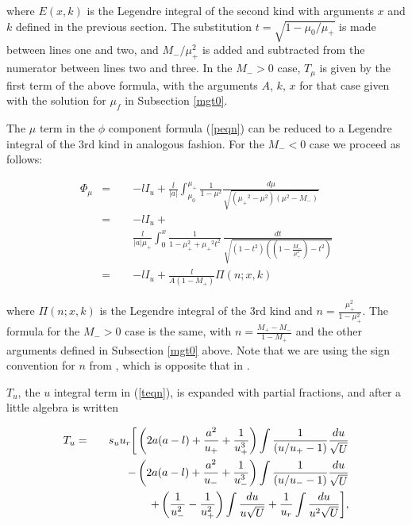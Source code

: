 \documentclass[apj]{emulateapj}
\begin{document}
\noindent where $E(x,k)$ is the Legendre integral of the second kind with arguments $x$ and $k$ defined in the previous section. The substitution $t=\sqrt{1-\mu_0/\mu_+}$ is made between lines one and two, and $M_-/\mu_+^2$ is added and subtracted from the numerator between lines two and three. In the $M_- > 0$ case, $T_\mu$ is given by the first term of the above formula, with the arguments $A$, $k$, $x$ for that case given with the solution for $\mu_f$ in Subsection \ref{mgt0}.

The $\mu$ term in the $\phi$ component formula (\ref{peqn}) can be reduced to a Legendre integral of the 3rd kind in analogous fashion. For the $M_- < 0$ case we proceed as follows:

\begin{eqnarray}
 \Phi_{\mu} &=& -l I_u + \frac{l}{\vert a \vert} \int_{\mu_0}^{\mu_+} \frac{1}{1-\mu^2}\frac{d\mu}{\sqrt{({\mu_+}^2-\mu^2)(\mu^2-M_-)}} \nonumber\\
          &=& -l I_u +\nonumber\\ &\qquad&\nonumber\frac{l}{\vert a \vert \mu_+} \int_0^x \frac{1}{1-\mu_+^2+{\mu_+}^2 t^2}\hspace{2pt} \frac{dt}{\sqrt{(1-t^2)((1-\frac{M_-}{\mu_+^2})-t^2)}} \\
          &=& -l I_u + \frac{l}{A(1-M_+)} \Pi(n;x,k)
\end{eqnarray}


\noindent where $\Pi(n;x,k)$ is the Legendre integral of the 3rd kind and $n=\frac{\mu_+^2}{1-\mu_+^2}$. The formula for the $M_- > 0$ case is the same, with $n=\frac{M_+ - M_-}{1-M_+}$ and the other arguments defined in Subsection \ref{mgt0} above. Note that we are using the sign convention for $n$ from \cite{numrecipes}, which is opposite that in \citet{abramstegun}.

$T_u$, the $u$ integral term in (\ref{teqn}), is expanded with partial fractions, and after a little algebra is written

\begin{eqnarray}
 T_u &=& s_u u_r \bigg{[} \left ( 2a(a-l)+\frac{a^2}{u_+}+\frac{1}{u_+^3} \right) \int \nonumber \frac{1}{(u/u_+-1)}\frac{du}{\sqrt{U}}\\&\qquad&-\left ( 2a(a-l)+\frac{a^2}{u_-}+\frac{1}{u_-^3}\right)\int\nonumber \frac{1}{(u/u_--1)}\frac{du}{\sqrt{U}}\\&\qquad&+\left ( \frac{1}{u_-^2}-\frac{1}{u_+^2}\right) \int \frac{du}{u \sqrt{U}} + \frac{1}{u_r} \int \frac{du}{u^2\sqrt{U}}\bigg{]},
\end{eqnarray}
\end{document}
